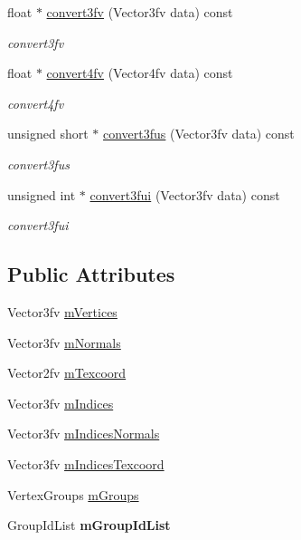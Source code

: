 \begin{DoxyCompactItemize}
float $\ast$ \hyperlink{classEngine_1_1MeshData_a13877adfbdc6d578210b413f3d0e10d8}{convert3fv} (Vector3fv data) const 
\begin{DoxyCompactList}\small\item\em convert3fv \end{DoxyCompactList}\item 
float $\ast$ \hyperlink{classEngine_1_1MeshData_a8add2a3afdc0092bddd817acc58fafb8}{convert4fv} (Vector4fv data) const 
\begin{DoxyCompactList}\small\item\em convert4fv \end{DoxyCompactList}\item 
unsigned short $\ast$ \hyperlink{classEngine_1_1MeshData_a783c1756456e0ccf4a5d8332fff90b24}{convert3fus} (Vector3fv data) const 
\begin{DoxyCompactList}\small\item\em convert3fus \end{DoxyCompactList}\item 
unsigned int $\ast$ \hyperlink{classEngine_1_1MeshData_a385bf1b2cfdcd69413babc9118bfbc3f}{convert3fui} (Vector3fv data) const 
\begin{DoxyCompactList}\small\item\em convert3fui \end{DoxyCompactList}\end{DoxyCompactItemize}
\subsection*{Public Attributes}
\begin{DoxyCompactItemize}
\item 
Vector3fv \hyperlink{classEngine_1_1MeshData_a84ddaab255b26058eea592d0f33d348f}{m\+Vertices}
\item 
Vector3fv \hyperlink{classEngine_1_1MeshData_ad304ab71be369540b57ddfe8e37791dd}{m\+Normals}
\item 
Vector2fv \hyperlink{classEngine_1_1MeshData_af3e2c2268d968d19bedf0b3e22d5bc36}{m\+Texcoord}
\item 
Vector3fv \hyperlink{classEngine_1_1MeshData_a5273f67bc976e8d2c8457fc28dad4b7c}{m\+Indices}
\item 
Vector3fv \hyperlink{classEngine_1_1MeshData_a7697dca5733d8ce89f2284301e59d467}{m\+Indices\+Normals}
\item 
Vector3fv \hyperlink{classEngine_1_1MeshData_ae2dd11c142688d4fcb76477438fc68b4}{m\+Indices\+Texcoord}
\item 
Vertex\+Groups \hyperlink{classEngine_1_1MeshData_ae106f9dd732ecceca735a5d6fc90f7f1}{m\+Groups}
\item 
\hypertarget{classEngine_1_1MeshData_ae2cd8763b9fb093ecb042f5de5c47334}{}Group\+Id\+List {\bfseries m\+Group\+Id\+List}\label{classEngine_1_1MeshData_ae2cd8763b9fb093ecb042f5de5c47334}

\end{DoxyCompactItemize}



